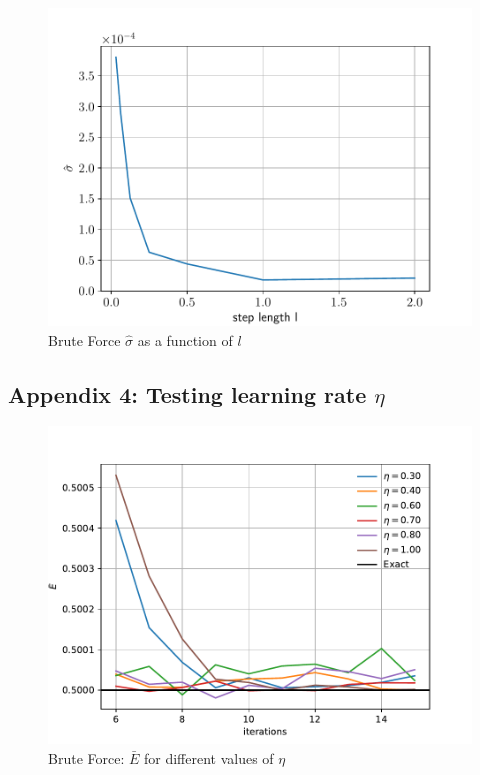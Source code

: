 \documentclass[%
oneside,                 %
final,                   %
10pt]{article}
\begin{document}
\begin{appendices}
\begin{figure}[H]
        \centering 
         \includegraphics[scale=0.6]{../Results/sim_3/error.pdf} 
        \caption{Brute Force $\hat \sigma$ as a function of $l$}
        \label{fig:app_4_BF}   
\end{figure}  

\subsection{Appendix 4: Testing learning rate $\eta$}
\begin{figure}[H]
        \centering 
         \includegraphics[scale=0.7]{../Results/sim_4/BF_eta.pdf} 
        \caption{Brute Force: $\bar E$ for different values of $\eta$ }
        \label{fig:training_BF}   
\end{figure}  


\end{appendices}
\end{document}
